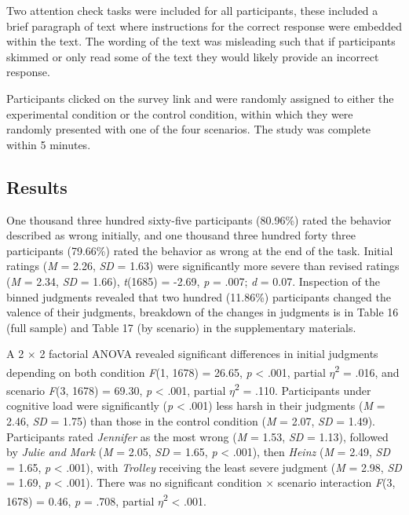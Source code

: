 \documentclass[
  man,floatsintext]{apa6}
\begin{document}
Two attention check tasks were included for all participants, these included a brief paragraph of text where instructions for the correct response were embedded within the text. The wording of the text was misleading such that if participants skimmed or only read some of the text they would likely provide an incorrect response.

Participants clicked on the survey link and were randomly assigned to either the experimental condition or the control condition, within which they were randomly presented with one of the four scenarios. The study was complete within 5 minutes.

\hypertarget{results}{%
\subsection{Results}\label{results}}

One thousand three hundred sixty-five participants (80.96\%) rated the behavior described as wrong initially, and one thousand three hundred forty three participants (79.66\%) rated the behavior as wrong at the end of the task. Initial ratings (\emph{M} = 2.26, \emph{SD} = 1.63) were significantly more severe than revised ratings (\emph{M} = 2.34, \emph{SD} = 1.66), \emph{t}(1685) = -2.69, \emph{p} = .007; \emph{d} = 0.07. Inspection of the binned judgments revealed that two hundred (11.86\%) participants changed the valence of their judgments, breakdown of the changes in judgments is in Table 16 (full sample) and Table 17 (by scenario) in the supplementary materials.

A 2 \(\times\) 2 factorial ANOVA revealed significant differences in initial judgments depending on both condition \emph{F}(1, 1678) = 26.65, \emph{p} \textless{} .001, partial \(\eta\)\textsuperscript{2} = .016, and scenario \emph{F}(3, 1678) = 69.30, \emph{p} \textless{} .001, partial \(\eta\)\textsuperscript{2} = .110. Participants under cognitive load were significantly (\emph{p} \textless{} .001) less harsh in their judgments (\emph{M} = 2.46, \emph{SD} = 1.75) than those in the control condition (\emph{M} = 2.07, \emph{SD} = 1.49). Participants rated \emph{Jennifer} as the most wrong (\emph{M} = 1.53, \emph{SD} = 1.13), followed by \emph{Julie and Mark} (\emph{M} = 2.05, \emph{SD} = 1.65, \emph{p} \textless{} .001), then \emph{Heinz} (\emph{M} = 2.49, \emph{SD} = 1.65, \emph{p} \textless{} .001), with \emph{Trolley} receiving the least severe judgment (\emph{M} = 2.98, \emph{SD} = 1.69, \emph{p} \textless{} .001). There was no significant condition \(\times\) scenario interaction \emph{F}(3, 1678) = 0.46, \emph{p} = .708, partial \(\eta\)\textsuperscript{2} \textless{} .001.
\end{document}
